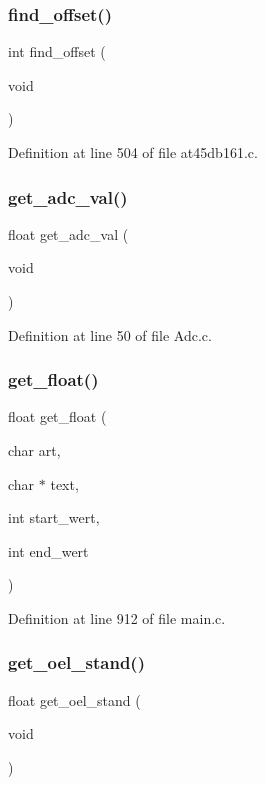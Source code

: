\subsubsection{find\+\_\+offset()}
{\footnotesize\ttfamily int find\+\_\+offset (\begin{DoxyParamCaption}\item[{void}]{ }\end{DoxyParamCaption})}



Definition at line 504 of file at45db161.\+c.

\mbox{\label{main_8c_ad7adec982039e6bbf58fd9ac980cbce1}} 
\subsubsection{get\+\_\+adc\+\_\+val()}
{\footnotesize\ttfamily float get\+\_\+adc\+\_\+val (\begin{DoxyParamCaption}\item[{void}]{ }\end{DoxyParamCaption})}



Definition at line 50 of file Adc.\+c.

\mbox{\label{main_8c_a83845db80bfe3eb87a51dfc526925079}} 
\subsubsection{get\+\_\+float()}
{\footnotesize\ttfamily float get\+\_\+float (\begin{DoxyParamCaption}\item[{char}]{art,  }\item[{char $\ast$}]{text,  }\item[{int}]{start\+\_\+wert,  }\item[{int}]{end\+\_\+wert }\end{DoxyParamCaption})}



Definition at line 912 of file main.\+c.

\mbox{\label{main_8c_a0ed37e617173ebc136c88d1301a9ecbd}} 
\subsubsection{get\+\_\+oel\+\_\+stand()}
{\footnotesize\ttfamily float get\+\_\+oel\+\_\+stand (\begin{DoxyParamCaption}\item[{void}]{ }\end{DoxyParamCaption})}



